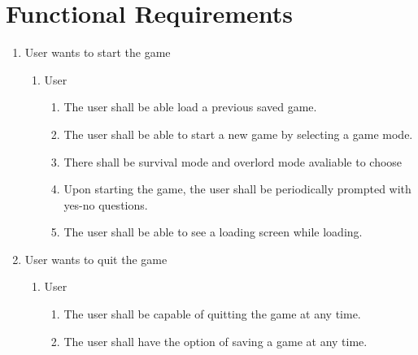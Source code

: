 \documentclass[]{article}
\begin{document}
\section{Functional Requirements}
\label{sec:functional_requirements}
\begin{enumerate}[{BE}1.]
   
   
    \item User wants to start the game
    \begin{enumerate}[{VP1}.1]
      \item User
      \begin{enumerate}
        \item The user shall be able load a previous saved game.
        \item The user shall be able to start a new game by selecting a game mode.
        \item There shall be survival mode and overlord mode avaliable to choose
        \item Upon starting the game, the user shall be periodically prompted with yes-no questions.
        \item The user shall be able to see a loading screen while loading.
      \end{enumerate}
    \end{enumerate}
 
    \item User wants to quit the game
    \begin{enumerate}[{VP1}.1]
      \item User
      \begin{enumerate}
        \item The user shall be capable of quitting the game at any time.
        \item The user shall have the option of saving a game at any time.
      \end{enumerate}
    \end{enumerate}
 

\end{enumerate}
\end{document}
